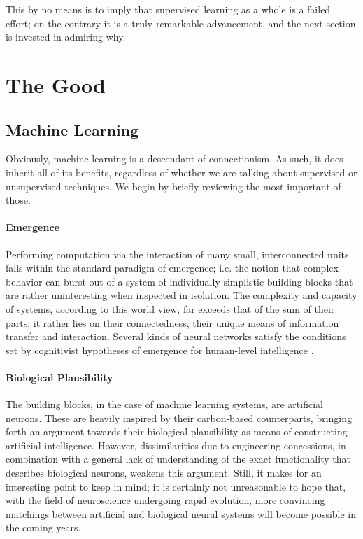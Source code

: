 \documentclass[]{article}
\begin{document}
This by no means is to imply that supervised learning as a whole is a failed effort; on the contrary it is a truly remarkable advancement, and the next section is invested in admiring why.

\section{The Good}

\subsection{Machine Learning}
Obviously, machine learning is a descendant of connectionism. As such, it does inherit all of its benefits, regardless of whether we are talking about supervised or unsupervised techniques. We begin by briefly reviewing the most important of those.

\paragraph{Emergence}
Performing computation via the interaction of many small, interconnected units falls within the standard paradigm of emergence; i.e. the notion that complex behavior can burst out of a system of individually simplistic building blocks that are rather uninteresting when inspected in isolation. The complexity and capacity of systems, according to this world view, far exceeds that of the sum of their parts; it rather lies on their connectedness, their unique means of information transfer and interaction. Several kinds of neural networks satisfy the conditions set by cognitivist hypotheses of emergence for human-level intelligence \cite{Penna2016, Hopfield1982}.

\paragraph{Biological Plausibility}
The building blocks, in the case of machine learning systems, are artificial neurons. These are heavily inspired by their carbon-based counterparts, bringing forth an argument towards their biological plausibility as means of constructing artificial intelligence. However, dissimilarities due to engineering concessions, in combination with a general lack of understanding of the exact functionality that describes biological neurons, weakens this argument. Still, it makes for an interesting point to keep in mind; it is certainly not unreasonable to hope that, with the field of neuroscience undergoing rapid evolution, more convincing matchings between artificial and biological neural systems will become possible in the coming years.
\end{document}
